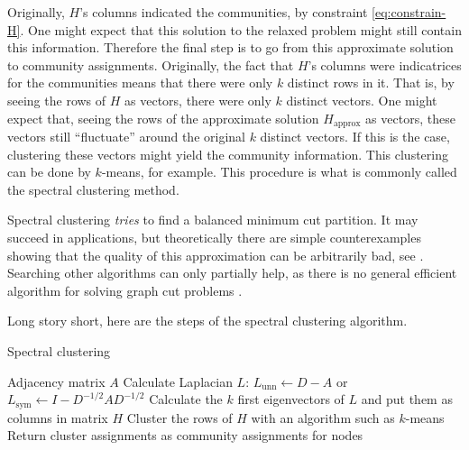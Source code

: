 \documentclass[../../main.tex]{subfiles} %
\begin{document}
Originally, \(H\)'s columns indicated the communities, by constraint 
\eqref{eq:constrain-H}. One might expect that this solution to the relaxed 
problem might still contain this information. Therefore the final step is to go 
from this approximate solution to community assignments. Originally, the fact 
that \(H\)'s columns were indicatrices for the communities means that there 
were only \(k\) distinct rows in it. That is, by seeing the rows of \(H\) as 
vectors, there were only \(k\) distinct vectors. One might expect that, seeing 
the rows of the approximate solution \(H_{\text{approx}}\) as vectors, these 
vectors still ``fluctuate'' around the original \(k\) distinct vectors. If this is the 
case, clustering these vectors might yield the community information. This 
clustering can be done by \(k\)-means, for example. This procedure is what is 
commonly called the spectral clustering method.




\begin{remark}
	Spectral clustering \textit{tries} to find a balanced minimum cut partition. It 
	may succeed in applications, but theoretically there are simple 
	counterexamples showing that the quality of this approximation can be 
	arbitrarily bad, see \cite{von_luxburg_tutorial_2007}. 
	Searching other algorithms can only partially help, as there is no general 
	efficient algorithm for solving graph cut problems 
	\cite{bui_finding_1992}.
\end{remark}

Long story short, here are the steps of the spectral clustering algorithm.
\begin{algorithm}
	\caption{Spectral clustering}
	\label{alg:spectral-clustering}
	\begin{algorithmic}
		\Require Adjacency matrix \(A\)
		\State Calculate Laplacian \(L\): \(L_{\text{unn}} \gets D - A\) or 
		\(L_{\text{sym}} \gets I - D^{-1/2} A D^{-1/2}\)
		\State Calculate the \(k\) first eigenvectors of \(L\) and put them as 
		columns in matrix \(H\)
		\State Cluster the rows of \(H\) with an algorithm such as 
		\(k\)-means
		\State Return cluster assignments as community assignments for 
		nodes
	\end{algorithmic}
\end{algorithm}
\end{document}
